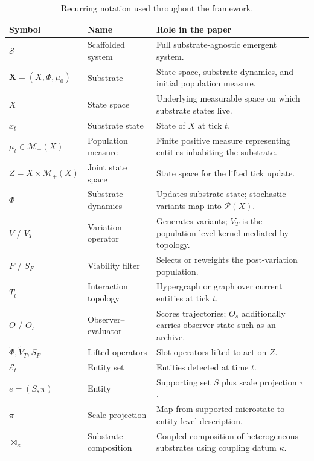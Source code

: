 \documentclass[journal]{IEEEtran}
\theoremstyle{plain}
\theoremstyle{definition}
\theoremstyle{plain}
\newcommand{\Pmeas}{\mathcal{P}}
\newcommand{\Mplus}{\mathcal{M}_{+}}
\newcommand{\X}{\mathbf{X}}
\begin{document}
\begin{table}[!t]
\caption{Recurring notation used throughout the framework.}
\label{tab:notation}
\centering
\renewcommand{\arraystretch}{1.12}
\setlength{\tabcolsep}{4pt}
\scriptsize
\begin{tabular}{@{}p{} p{} p{}@{}}
\hline
\textbf{Symbol} & \textbf{Name} & \textbf{Role in the paper} \\
\hline
$\mathcal{S}$ & Scaffolded system & Full substrate-agnostic emergent system. \\
$\X=(X,\Phi,\mu_0)$ & Substrate & State space, substrate dynamics, and initial population measure. \\
$X$ & State space & Underlying measurable space on which substrate states live. \\
$x_t$ & Substrate state & State of $X$ at tick $t$. \\
$\mu_t \in \Mplus(X)$ & Population measure & Finite positive measure representing entities inhabiting the substrate. \\
$Z=X\times\Mplus(X)$ & Joint state space & State space for the lifted tick update. \\
$\Phi$ & Substrate dynamics & Updates substrate state; stochastic variants map into $\Pmeas(X)$. \\
$V$ / $V_T$ & Variation operator & Generates variants; $V_T$ is the population-level kernel mediated by topology. \\
$F$ / $S_F$ & Viability filter & Selects or reweights the post-variation population. \\
$T_t$ & Interaction topology & Hypergraph or graph over current entities at tick $t$. \\
$O$ / $O_s$ & Observer--evaluator & Scores trajectories; $O_s$ additionally carries observer state such as an archive. \\
$\widetilde{\Phi},\widetilde V_T,\widetilde S_F$ & Lifted operators & Slot operators lifted to act on $Z$. \\
$\mathcal{E}_t$ & Entity set & Entities detected at time $t$. \\
$e=(S,\pi)$ & Entity & Supporting set $S$ plus scale projection $\pi$. \\
$\pi$ & Scale projection & Map from supported microstate to entity-level description. \\
$\boxtimes_\kappa$ & Substrate composition & Coupled composition of heterogeneous substrates using coupling datum $\kappa$. \\

\end{tabular}
\end{table}
\end{document}
